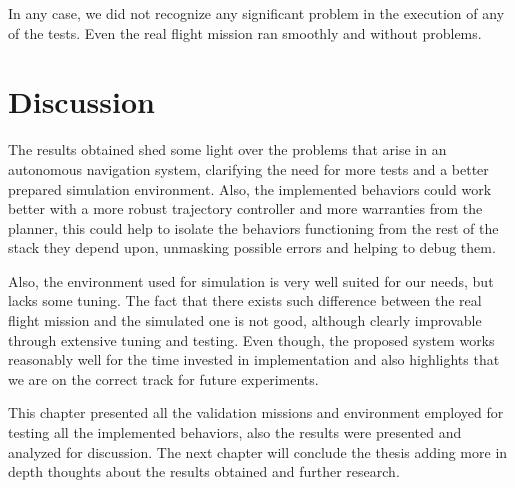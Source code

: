   In any case, we did not recognize any significant problem in the execution of any of the tests. Even the real flight mission ran smoothly and without problems.

\section{Discussion} \label{ch_5:sect:discussion}

  The results obtained shed some light over the problems that arise in an autonomous navigation system, clarifying the need for more tests and a better prepared simulation environment. Also, the implemented behaviors could work better with a more robust trajectory controller and more warranties from the planner, this could help to isolate the behaviors functioning from the rest of the stack they depend upon, unmasking possible errors and helping to debug them.

  Also, the environment used for simulation is very well suited for our needs, but lacks some tuning. The fact that there exists such difference between  the real flight mission and the simulated one is not good, although clearly improvable through extensive tuning and testing. Even though, the proposed system works reasonably well for the time invested in implementation and also highlights that we are on the correct track for future experiments.

This chapter presented all the validation missions and environment employed for testing all the implemented behaviors, also the results were presented and analyzed for discussion. The next chapter will conclude the thesis adding more in depth thoughts about the results obtained and further research.
